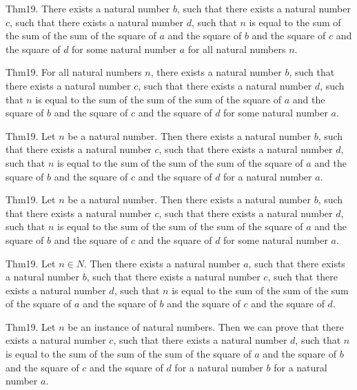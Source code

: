 \documentclass{article}
\begin{document}
Thm19. There exists a natural number $b$, such that there exists a natural number $c$, such that there exists a natural number $d$, such that $n$ is equal to the sum of the sum of the sum of the square of $a$ and the square of $b$ and the square of $c$ and the square of $d$ for some natural number $a$ for all natural numbers $n$.

Thm19. For all natural numbers $n$, there exists a natural number $b$, such that there exists a natural number $c$, such that there exists a natural number $d$, such that $n$ is equal to the sum of the sum of the sum of the square of $a$ and the square of $b$ and the square of $c$ and the square of $d$ for some natural number $a$.

Thm19. Let $n$ be a natural number. Then there exists a natural number $b$, such that there exists a natural number $c$, such that there exists a natural number $d$, such that $n$ is equal to the sum of the sum of the sum of the square of $a$ and the square of $b$ and the square of $c$ and the square of $d$ for a natural number $a$.

Thm19. Let $n$ be a natural number. Then there exists a natural number $b$, such that there exists a natural number $c$, such that there exists a natural number $d$, such that $n$ is equal to the sum of the sum of the sum of the square of $a$ and the square of $b$ and the square of $c$ and the square of $d$ for some natural number $a$.

Thm19. Let $n \in N$. Then there exists a natural number $a$, such that there exists a natural number $b$, such that there exists a natural number $c$, such that there exists a natural number $d$, such that $n$ is equal to the sum of the sum of the sum of the square of $a$ and the square of $b$ and the square of $c$ and the square of $d$.

Thm19. Let $n$ be an instance of natural numbers. Then we can prove that there exists a natural number $c$, such that there exists a natural number $d$, such that $n$ is equal to the sum of the sum of the sum of the square of $a$ and the square of $b$ and the square of $c$ and the square of $d$ for a natural number $b$ for a natural number $a$.
\end{document}
